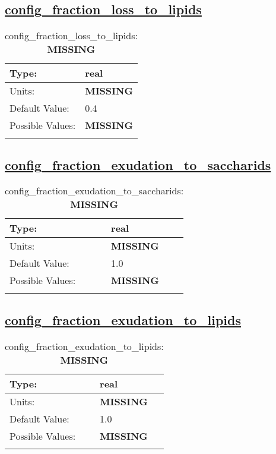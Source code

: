 \subsection[config\_fraction\_loss\_to\_lipids]{\hyperref[sec:nm_tab_biogeochemistry]{config\_fraction\_loss\_to\_lipids}}
\label{subsec:nm_sec_config_fraction_loss_to_lipids}
\begin{center}
\begin{longtable}{| p{2.0in} || p{4.0in} |}
    \hline
    Type: & real \\
    \hline
    Units: & {\bf \color{red} MISSING} \\
    \hline
    Default Value: & 0.4 \\
    \hline
    Possible Values: & {\bf \color{red} MISSING} \\
    \hline
    \caption{config\_fraction\_loss\_to\_lipids: {\bf \color{red} MISSING}}
\end{longtable}
\end{center}
\subsection[config\_fraction\_exudation\_to\_saccharids]{\hyperref[sec:nm_tab_biogeochemistry]{config\_fraction\_exudation\_to\_saccharids}}
\label{subsec:nm_sec_config_fraction_exudation_to_saccharids}
\begin{center}
\begin{longtable}{| p{2.0in} || p{4.0in} |}
    \hline
    Type: & real \\
    \hline
    Units: & {\bf \color{red} MISSING} \\
    \hline
    Default Value: & 1.0 \\
    \hline
    Possible Values: & {\bf \color{red} MISSING} \\
    \hline
    \caption{config\_fraction\_exudation\_to\_saccharids: {\bf \color{red} MISSING}}
\end{longtable}
\end{center}
\subsection[config\_fraction\_exudation\_to\_lipids]{\hyperref[sec:nm_tab_biogeochemistry]{config\_fraction\_exudation\_to\_lipids}}
\label{subsec:nm_sec_config_fraction_exudation_to_lipids}
\begin{center}
\begin{longtable}{| p{2.0in} || p{4.0in} |}
    \hline
    Type: & real \\
    \hline
    Units: & {\bf \color{red} MISSING} \\
    \hline
    Default Value: & 1.0 \\
    \hline
    Possible Values: & {\bf \color{red} MISSING} \\
    \hline
    \caption{config\_fraction\_exudation\_to\_lipids: {\bf \color{red} MISSING}}
\end{longtable}
\end{center}
